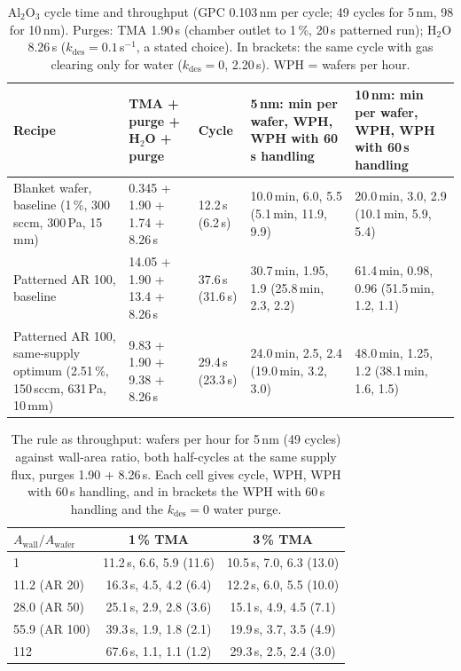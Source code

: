 \documentclass[11pt,letterpaper]{article}
\newcommand{\Awall}{A_{\mathrm{wall}}/A_{\mathrm{wafer}}}
\begin{document}
\begin{table}[tbp]
\centering
\caption{Al$_2$O$_3$ cycle time and throughput (GPC 0.103\,nm per cycle; 49 cycles for 5\,nm, 98 for 10\,nm). Purges: TMA 1.90\,s (chamber outlet to 1\,\%, 20\,s patterned run); H$_2$O 8.26\,s ($k_{\mathrm{des}} = 0.1$\,s$^{-1}$, a stated choice). In brackets: the same cycle with gas clearing only for water ($k_{\mathrm{des}} = 0$, 2.20\,s). WPH = wafers per hour.}
\label{tab:cycle}
\footnotesize
\setlength{\tabcolsep}{4pt}
\begin{tabular}{P{1.4in}P{1.15in}P{0.65in}P{1.3in}P{1.3in}}
\toprule
Recipe & TMA + purge + H$_2$O + purge & Cycle & 5\,nm: min per wafer, WPH, WPH with 60\,s handling & 10\,nm: min per wafer, WPH, WPH with 60\,s handling \\
\midrule
Blanket wafer, baseline (1\,\%, 300\,sccm, 300\,Pa, 15\,mm) & 0.345 + 1.90 + 1.74 + 8.26\,s & 12.2\,s (6.2\,s) & 10.0\,min, 6.0, 5.5 (5.1\,min, 11.9, 9.9) & 20.0\,min, 3.0, 2.9 (10.1\,min, 5.9, 5.4) \\
Patterned AR 100, baseline & 14.05 + 1.90 + 13.4 + 8.26\,s & 37.6\,s (31.6\,s) & 30.7\,min, 1.95, 1.9 (25.8\,min, 2.3, 2.2) & 61.4\,min, 0.98, 0.96 (51.5\,min, 1.2, 1.1) \\
Patterned AR 100, same-supply optimum (2.51\,\%, 150\,sccm, 631\,Pa, 10\,mm) & 9.83 + 1.90 + 9.38 + 8.26\,s & 29.4\,s (23.3\,s) & 24.0\,min, 2.5, 2.4 (19.0\,min, 3.2, 3.0) & 48.0\,min, 1.25, 1.2 (38.1\,min, 1.6, 1.5) \\
\bottomrule
\end{tabular}
\end{table}

\begin{table}[tbp]
\centering
\caption{The rule as throughput: wafers per hour for 5\,nm (49 cycles) against wall-area ratio, both half-cycles at the same supply flux, purges 1.90 + 8.26\,s. Each cell gives cycle, WPH, WPH with 60\,s handling, and in brackets the WPH with 60\,s handling and the $k_{\mathrm{des}} = 0$ water purge.}
\label{tab:wph}
\footnotesize
\begin{tabular}{lcc}
\toprule
$\Awall$ & 1\,\% TMA & 3\,\% TMA \\
\midrule
1 & 11.2\,s, 6.6, 5.9 (11.6) & 10.5\,s, 7.0, 6.3 (13.0) \\
11.2 (AR 20) & 16.3\,s, 4.5, 4.2 (6.4) & 12.2\,s, 6.0, 5.5 (10.0) \\
28.0 (AR 50) & 25.1\,s, 2.9, 2.8 (3.6) & 15.1\,s, 4.9, 4.5 (7.1) \\
55.9 (AR 100) & 39.3\,s, 1.9, 1.8 (2.1) & 19.9\,s, 3.7, 3.5 (4.9) \\
112 & 67.6\,s, 1.1, 1.1 (1.2) & 29.3\,s, 2.5, 2.4 (3.0) \\
\bottomrule
\end{tabular}
\end{table}
\end{document}
